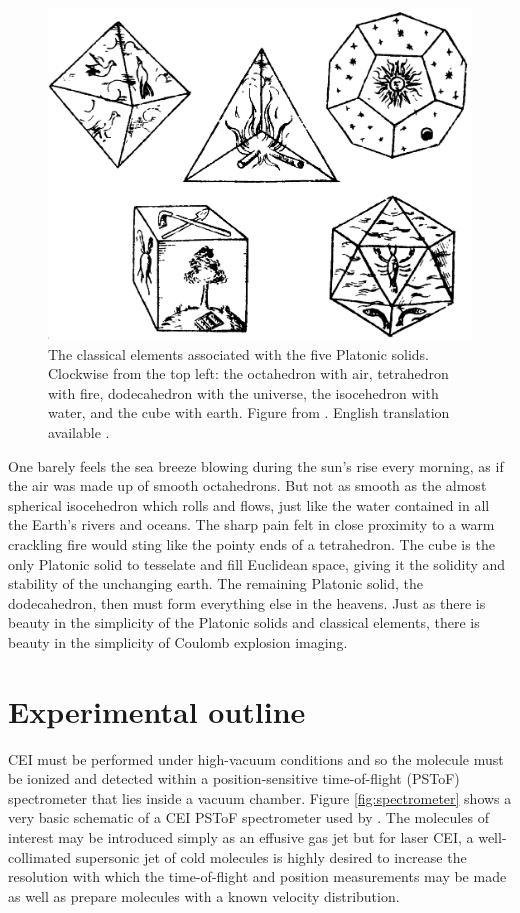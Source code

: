 \begin{figure}
  \centering
  \includegraphics[width=\textwidth]{gfx/PlatonicSolids}
  \caption[The classical elements associated with the five Platonic solids.]
  {The classical elements associated with the five Platonic solids. Clockwise from the top left: the octahedron with air, tetrahedron with fire, dodecahedron with the universe, the isocehedron with water, and the cube with earth. Figure from \citet[Book 2, p. 53]{Kepler1619}. English translation available \citep{Kepler97}.}
  \label{fig:platonicSolids}
\end{figure}

One barely feels the sea breeze blowing during the sun's rise every morning, as if the air was made up of smooth octahedrons. But not as smooth as the almost spherical isocehedron which rolls and flows, just like the water contained in all the Earth's rivers and oceans. The sharp pain felt in close proximity to a warm crackling fire would sting like the pointy ends of a tetrahedron. The cube is the only Platonic solid to tesselate and fill Euclidean space, giving it the solidity and stability of the unchanging earth. The remaining Platonic solid, the dodecahedron, then must form everything else in the heavens. Just as there is beauty in the simplicity of the Platonic solids and classical elements, there is beauty in the simplicity of Coulomb explosion imaging.

\section{Experimental outline} \label{sec:CEIphysics}
CEI must be performed under high-vacuum conditions and so the molecule must be ionized and detected within a position-sensitive time-of-flight (PSToF) spectrometer that lies inside a vacuum chamber. Figure \ref{fig:spectrometer} shows a very basic schematic of a CEI PSToF spectrometer used by \citet{Ramadhan16}. The molecules of interest may be introduced simply as an effusive gas jet but for laser CEI, a well-collimated supersonic jet of cold molecules is highly desired to increase the resolution with which the time-of-flight and position measurements may be made \citep{Dorner00} as well as prepare molecules with a known velocity distribution.

